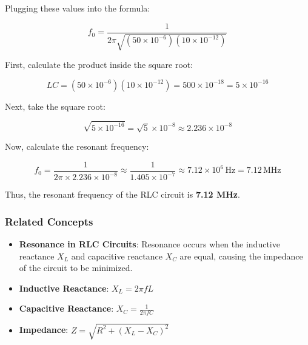 Plugging these values into the formula:

\[
f_0 = \frac{1}{2\pi\sqrt{(50 \times 10^{-6})(10 \times 10^{-12})}}
\]

First, calculate the product inside the square root:

\[
LC = (50 \times 10^{-6})(10 \times 10^{-12}) = 500 \times 10^{-18} = 5 \times 10^{-16}
\]

Next, take the square root:

\[
\sqrt{5 \times 10^{-16}} = \sqrt{5} \times 10^{-8} \approx 2.236 \times 10^{-8}
\]

Now, calculate the resonant frequency:

\[
f_0 = \frac{1}{2\pi \times 2.236 \times 10^{-8}} \approx \frac{1}{1.405 \times 10^{-7}} \approx 7.12 \times 10^6 \, \text{Hz} = 7.12 \, \text{MHz}
\]

Thus, the resonant frequency of the RLC circuit is \textbf{7.12 MHz}.

\subsubsection*{Related Concepts}
\begin{itemize}
    \item \textbf{Resonance in RLC Circuits}: Resonance occurs when the inductive reactance \( X_L \) and capacitive reactance \( X_C \) are equal, causing the impedance of the circuit to be minimized.
    \item \textbf{Inductive Reactance}: \( X_L = 2\pi f L \)
    \item \textbf{Capacitive Reactance}: \( X_C = \frac{1}{2\pi f C} \)
    \item \textbf{Impedance}: \( Z = \sqrt{R^2 + (X_L - X_C)^2} \)
\end{itemize}

